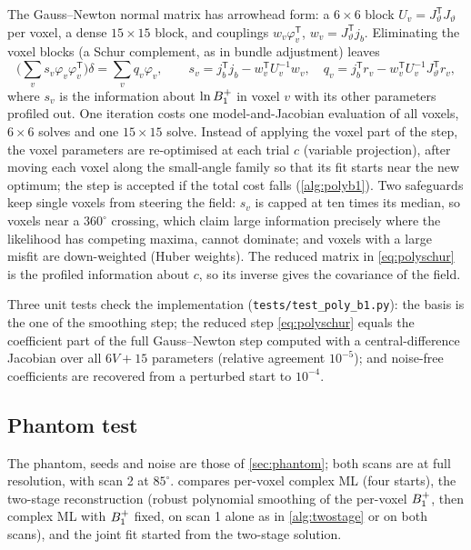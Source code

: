 The Gauss--Newton normal matrix has arrowhead form: a $6\times6$ block $U_v=J_\vartheta^{\mathsf T}J_\vartheta$
per voxel, a dense $15\times15$ block, and couplings $w_v\varphi_v^{\mathsf T}$, $w_v=J_\vartheta^{\mathsf T}j_b$.
Eliminating the voxel blocks (a Schur complement, as in bundle adjustment) leaves
\begin{equation}
\Big(\sum_v s_v\varphi_v\varphi_v^{\mathsf T}\Big)\delta=\sum_v q_v\varphi_v,\qquad
s_v=j_b^{\mathsf T}j_b-w_v^{\mathsf T}U_v^{-1}w_v,\quad q_v=j_b^{\mathsf T}r_v-w_v^{\mathsf T}U_v^{-1}J_\vartheta^{\mathsf T}r_v,
\label{eq:polyschur}
\end{equation}
where $s_v$ is the information about $\ln B_1^{+}$ in voxel $v$ with its other parameters profiled
out. One iteration costs one model-and-Jacobian evaluation of all voxels, $6\times6$ solves and
one $15\times15$ solve. Instead of applying the voxel part of the step, the voxel parameters are
re-optimised at each trial $c$ (variable projection), after moving each voxel along the
small-angle family so that its fit starts near the new optimum; the step is accepted if the
total cost falls (\cref{alg:polyb1}). Two safeguards keep single voxels from steering the field:
$s_v$ is capped at ten times its median, so voxels near a $360^\circ$ crossing, which claim large
information precisely where the likelihood has competing maxima, cannot dominate; and voxels
with a large misfit are down-weighted (Huber weights). The reduced matrix in \eqref{eq:polyschur}
is the profiled information about $c$, so its inverse gives the covariance of the field.

Three unit tests check the implementation (\texttt{tests/test\_poly\_b1.py}): the basis is the
one of the smoothing step; the reduced step \eqref{eq:polyschur} equals the coefficient part of
the full Gauss--Newton step computed with a central-difference Jacobian over all $6V+15$
parameters (relative agreement $10^{-5}$); and noise-free coefficients are recovered from a
perturbed start to $10^{-4}$.

\subsection{Phantom test}

The phantom, seeds and noise are those of \cref{sec:phantom}; both scans are at full resolution,
with scan 2 at $85^\circ$.  compares per-voxel complex ML (four starts), the
two-stage reconstruction (robust polynomial smoothing of the per-voxel $B_1^{+}$, then complex ML
with $B_1^{+}$ fixed, on scan 1 alone as in \cref{alg:twostage} or on both scans), and the joint fit
started from the two-stage solution.

